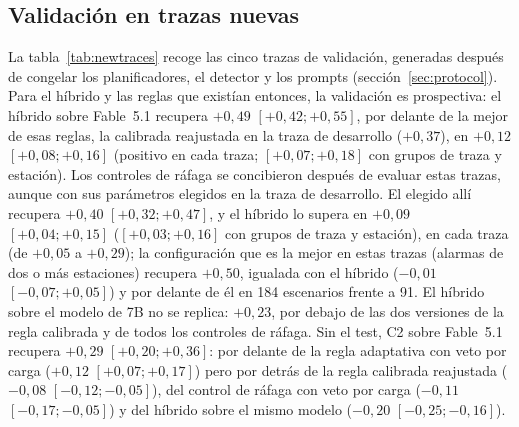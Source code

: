 \documentclass[preprint,11pt]{elsarticle}
\begin{document}
\subsection{Validación en trazas nuevas}
\label{sec:newtraces}
La tabla~\ref{tab:newtraces} recoge las cinco trazas de validación, generadas después de congelar los planificadores, el detector y los prompts (sección~\ref{sec:protocol}). Para el híbrido y las reglas que existían entonces, la validación es prospectiva: el híbrido sobre Fable~5.1 recupera $+0{,}49$ $[+0{,}42; +0{,}55]$, por delante de la mejor de esas reglas, la calibrada reajustada en la traza de desarrollo ($+0{,}37$), en $+0{,}12$ $[+0{,}08; +0{,}16]$ (positivo en cada traza; $[+0{,}07; +0{,}18]$ con grupos de traza y estación). Los controles de ráfaga se concibieron después de evaluar estas trazas, aunque con sus parámetros elegidos en la traza de desarrollo. El elegido allí recupera $+0{,}40$ $[+0{,}32; +0{,}47]$, y el híbrido lo supera en $+0{,}09$ $[+0{,}04; +0{,}15]$ ($[+0{,}03; +0{,}16]$ con grupos de traza y estación), en cada traza (de $+0{,}05$ a $+0{,}29$); la configuración que es la mejor en estas trazas (alarmas de dos o más estaciones) recupera $+0{,}50$, igualada con el híbrido ($-0{,}01$ $[-0{,}07; +0{,}05]$) y por delante de él en 184 escenarios frente a 91. El híbrido sobre el modelo de 7B no se replica: $+0{,}23$, por debajo de las dos versiones de la regla calibrada y de todos los controles de ráfaga. Sin el test, C2 sobre Fable~5.1 recupera $+0{,}29$ $[+0{,}20; +0{,}36]$: por delante de la regla adaptativa con veto por carga ($+0{,}12$ $[+0{,}07; +0{,}17]$) pero por detrás de la regla calibrada reajustada ($-0{,}08$ $[-0{,}12; -0{,}05]$), del control de ráfaga con veto por carga ($-0{,}11$ $[-0{,}17; -0{,}05]$) y del híbrido sobre el mismo modelo ($-0{,}20$ $[-0{,}25; -0{,}16]$).
\end{document}
